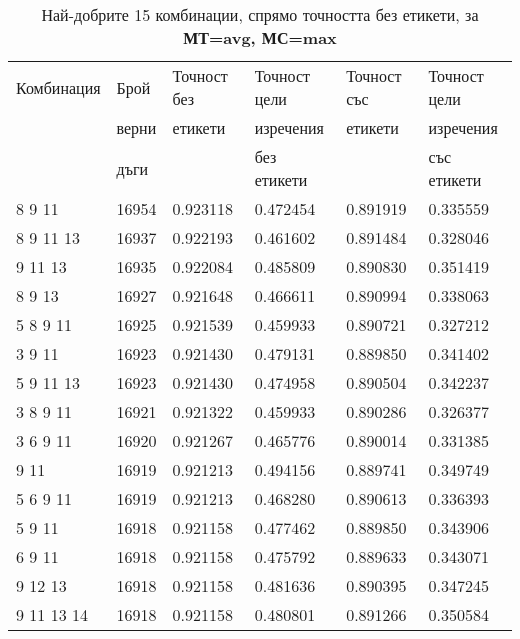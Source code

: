 \begin{table}[!htb] 
\caption{Най-добрите 15 комбинации, спрямо точността без етикети, за \textbf{МТ=avg, МС=max}}
  \begin{tabular}{|l|l|l|l|l|l|}
\hline 
Комбинация & Брой  & Точност без  & Точност цели  & Точност със  & Точност цели  \\
 & верни	& етикети & изречения & етикети & изречения \\
 & дъги	& 	& без етикети & 	& със етикети \\
\hline 
8 9 11 &	16954 &	0.923118 &	0.472454 &	0.891919 &	0.335559\\ 
\hline 
8 9 11 13 &	16937 &	0.922193 &	0.461602 &	0.891484 &	0.328046\\ 
\hline 
9 11 13 &	16935 &	0.922084 &	0.485809 &	0.890830 &	0.351419\\ 
\hline 
8 9 13 &	16927 &	0.921648 &	0.466611 &	0.890994 &	0.338063\\ 
\hline 
5 8 9 11 &	16925 &	0.921539 &	0.459933 &	0.890721 &	0.327212\\ 
\hline 
3 9 11 &	16923 &	0.921430 &	0.479131 &	0.889850 &	0.341402\\ 
\hline 
5 9 11 13 &	16923 &	0.921430 &	0.474958 &	0.890504 &	0.342237\\ 
\hline 
3 8 9 11 &	16921 &	0.921322 &	0.459933 &	0.890286 &	0.326377\\ 
\hline 
3 6 9 11 &	16920 &	0.921267 &	0.465776 &	0.890014 &	0.331385\\ 
\hline 
9 11 &	16919 &	0.921213 &	0.494156 &	0.889741 &	0.349749\\ 
\hline 
5 6 9 11 &	16919 &	0.921213 &	0.468280 &	0.890613 &	0.336393\\ 
\hline 
5 9 11 &	16918 &	0.921158 &	0.477462 &	0.889850 &	0.343906\\ 
\hline 
6 9 11 &	16918 &	0.921158 &	0.475792 &	0.889633 &	0.343071\\ 
\hline 
9 12 13 &	16918 &	0.921158 &	0.481636 &	0.890395 &	0.347245\\ 
\hline 
9 11 13 14 &	16918 &	0.921158 &	0.480801 &	0.891266 &	0.350584\\ 
\hline 
 \end{tabular}
 \label{tab:lab_max_avg}
 \end{table}